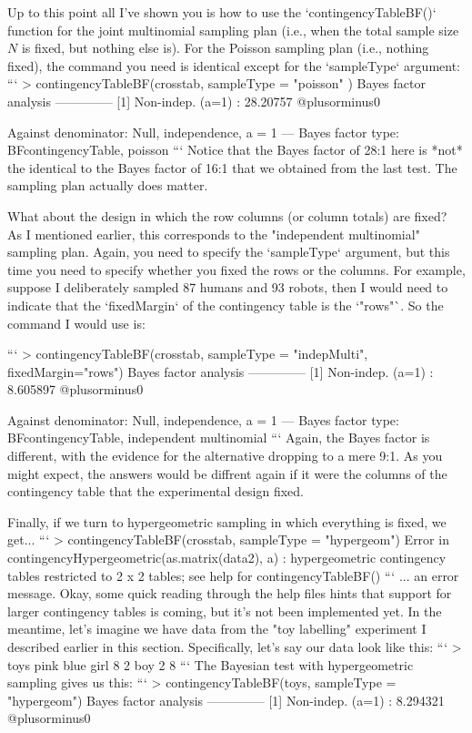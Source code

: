 Up to this point all I've shown you is how to use the `contingencyTableBF()` function for the joint multinomial sampling plan (i.e., when the total sample size $N$ is fixed, but nothing else is). For the Poisson sampling plan (i.e., nothing fixed), the command you need is identical except for the `sampleType` argument:
```
> contingencyTableBF(crosstab, sampleType = "poisson" )
Bayes factor analysis
--------------
[1] Non-indep. (a=1) : 28.20757 @plusorminus0%

Against denominator:
  Null, independence, a = 1 
---
Bayes factor type: BFcontingencyTable, poisson
```
Notice that the Bayes factor of 28:1 here is *not* the identical to the Bayes factor of 16:1 that we obtained from the last test. The sampling plan actually does matter. 

What about the design in which the row columns (or column totals) are fixed? As I mentioned earlier, this corresponds to the "independent multinomial" sampling plan. Again, you need to specify the `sampleType` argument, but this time you need to specify whether you fixed the rows or the columns. For example, suppose I deliberately sampled 87 humans and 93 robots, then I would need to indicate that the `fixedMargin` of the contingency table is the `"rows"`. So the command I would use is:

```
> contingencyTableBF(crosstab, sampleType = "indepMulti", fixedMargin="rows")
Bayes factor analysis
--------------
[1] Non-indep. (a=1) : 8.605897 @plusorminus0%

Against denominator:
  Null, independence, a = 1 
---
Bayes factor type: BFcontingencyTable, independent multinomial
```
Again, the Bayes factor is different, with the evidence for the alternative dropping to a mere 9:1. As you might expect, the answers would be diffrent again if it were the columns of the contingency table that the experimental design fixed. 


Finally, if we turn to hypergeometric sampling in which everything is fixed, we get...
```
> contingencyTableBF(crosstab, sampleType = "hypergeom")
Error in contingencyHypergeometric(as.matrix(data2), a) : 
  hypergeometric contingency tables restricted to 2 x 2 tables; see help for contingencyTableBF()
```
... an error message. Okay, some quick reading through the help files hints that support for larger contingency tables is coming, but it's not been implemented yet. In the meantime, let's imagine we have data from the "toy labelling" experiment I described earlier in this section. Specifically, let's say our data look like this:
```
> toys
     pink blue
girl    8    2
boy     2    8
```
The Bayesian test with hypergeometric sampling gives us this:
```
> contingencyTableBF(toys, sampleType = "hypergeom")
Bayes factor analysis
--------------
[1] Non-indep. (a=1) : 8.294321 @plusorminus0%

